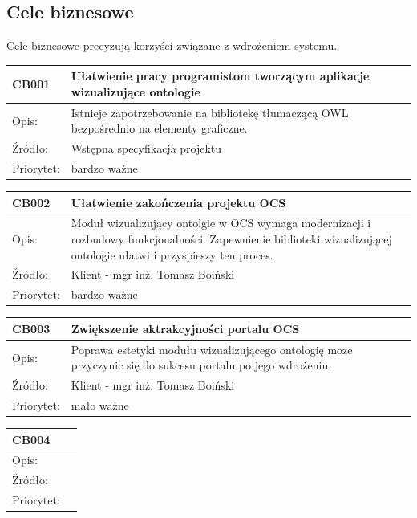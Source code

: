 \documentclass[a4paper,10pt]{article}
\begin{document}
\subsection{Cele biznesowe}

Cele biznesowe precyzują korzyści związane z wdrożeniem systemu.


\begin{tabular}{|p{3cm}|p{9cm}|} \hline

CB001 & Ułatwienie pracy programistom tworzącym aplikacje wizualizujące ontologie  \\ \hline
Opis: & Istnieje zapotrzebowanie na bibliotekę tłumaczącą OWL bezpośrednio na elementy graficzne.  \\ \hline
Źródło: & Wstępna specyfikacja projektu \\ \hline
Priorytet: & bardzo ważne \\ \hline
\end{tabular}


\begin{tabular}{|p{3cm}|p{9cm}|} \hline
CB002 & Ułatwienie zakończenia projektu OCS   \\ \hline
Opis: & Moduł wizualizujący ontolgie w OCS wymaga modernizacji i rozbudowy funkcjonalności. Zapewnienie biblioteki wizualizującej ontologie ułatwi i przyspieszy ten proces.  \\ \hline
Źródło:& Klient - mgr inż. Tomasz Boiński   \\ \hline
Priorytet: & bardzo ważne \\ \hline
\end{tabular}



\begin{tabular}{|p{3cm}|p{9cm}|} \hline
CB003 & Zwiększenie aktrakcyjności portalu OCS   \\ \hline
Opis: & Poprawa estetyki modułu wizualizującego ontologię moze przyczynic się do sukcesu portalu po jego wdrożeniu.  \\ \hline
Źródło: & Klient - mgr inż. Tomasz Boiński \\ \hline
Priorytet: & mało ważne \\ \hline
\end{tabular}

\begin{tabular}{|p{3cm}|p{9cm}|} \hline
CB004 &    \\ \hline
Opis: &   \\ \hline
Źródło: &  \\ \hline
Priorytet: & \\ \hline
\end{tabular}
\end{document}
